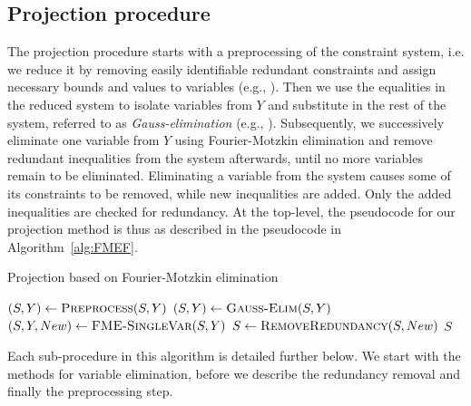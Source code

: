 \documentclass{llncs}
\begin{document}
\subsection{Projection procedure}\label{sec:projMethod}
The projection procedure starts with a preprocessing of the constraint system, i.e. we reduce it by removing easily identifiable redundant constraints and assign necessary bounds and values to variables (e.g., \cite{brearley75,andersen95,maros}).
Then we use the equalities in the reduced system to isolate variables from $Y$ and substitute in the rest of the system, %
referred to as \emph{Gauss-elimination} (e.g., \cite{duffin74,simon05}).  
Subsequently, we successively eliminate one variable from $Y$ using Fourier-Motzkin elimination and remove redundant inequalities from the system afterwards, until no more variables remain to be eliminated. Eliminating a variable from the system causes some of its constraints to be removed, while new inequalities are added. Only the added inequalities are checked for redundancy. %
At the top-level, the pseudocode for our projection method is thus as described in the pseudocode in Algorithm~\ref{alg:FMEF}. 
\setlength{\floatsep}{10pt} %
\setlength{\textfloatsep}{14pt} %
\begin{algorithm}[tb]
\caption{Projection based on Fourier-Motzkin elimination} 
\label{alg:FMEF}
\begin{algorithmic}
	\State $(S,Y)\gets \Call{Preprocess}{S,Y}$
	\State $(S,Y)\gets\Call{Gauss-Elim}{S,Y}$
		\State $(S, Y, New )\gets\Call{FME-SingleVar}{S,Y}$
		\State $S\gets\Call{RemoveRedundancy}{S,New}$
	\EndWhile
	\State \Return $S$
\EndFunction
\end{algorithmic}
\end{algorithm}
Each sub-procedure in this algorithm is detailed further below. We start with the methods for variable elimination, before we describe the redundancy removal and finally the preprocessing step. 
\end{document}
